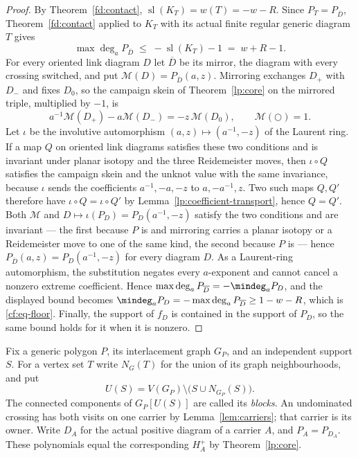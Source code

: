 \begin{proof}
By Theorem~\ref{fd:contact}, $\operatorname{sl}(K_T)=w(T)=-w-R$. Since
$P_T=P_{\overline D}$, Theorem~\ref{fd:contact} applied to $K_T$ with its
actual finite regular generic diagram $T$ gives
\[
\max\deg_a P_{\overline D}\;\leq\;-\operatorname{sl}(K_T)-1\;=\;w+R-1 .
\]
For every oriented link diagram $D$ let $\overline D$ be its mirror, the
diagram with every crossing switched, and put
$\mathcal M(D)=P_{\overline D}(a,z)$. Mirroring exchanges $D_+$ with $D_-$
and fixes $D_0$, so the campaign skein of Theorem~\ref{lp:core} on the
mirrored triple, multiplied by $-1$, is
\[
 a^{-1}\mathcal M(D_+)-a\mathcal M(D_-)=-z\,\mathcal M(D_0),
 \qquad \mathcal M(\bigcirc)=1.
\]
Let $\iota$ be the involutive automorphism $(a,z)\mapsto(a^{-1},-z)$ of
the Laurent ring. If a map $Q$ on oriented link diagrams satisfies these
two conditions and is invariant under planar isotopy and the three
Reidemeister moves, then $\iota\circ Q$ satisfies the campaign skein and
the unknot value with the same invariance, because $\iota$ sends the
coefficients $a^{-1},-a,-z$ to $a,-a^{-1},z$. Two such maps $Q,Q'$
therefore have $\iota\circ Q=\iota\circ Q'$ by
Lemma~\ref{lp:coefficient-transport}, hence $Q=Q'$. Both $\mathcal M$
and $D\mapsto\iota(P_D)=P_D(a^{-1},-z)$ satisfy the two conditions and are
invariant --- the first because $P$ is and mirroring carries a planar
isotopy or a Reidemeister move to one of the same kind, the second because
$P$ is --- hence $P_{\overline D}(a,z)=P_D(a^{-1},-z)$ for every diagram
$D$. As a Laurent-ring automorphism, the
substitution negates every $a$-exponent and cannot cancel a nonzero extreme
coefficient. Hence
$\max\deg_a P_{\overline D}=-\mindeg_a P_D$, and the displayed bound becomes
$\mindeg_a P_D=-\max\deg_a P_{\overline D}\geq1-w-R$, which is
\eqref{cf:eq-floor}. Finally, the support of $f_D$ is contained in the support of
$P_D$, so the same bound holds for it when it is nonzero.

\end{proof}

\begin{definition}\label{cb:blocks}\leanok
Fix a generic polygon $P$, its interlacement graph $G_P$, and an
independent support $S$. For a vertex set $T$ write $N_G(T)$ for the
union of its graph neighbourhoods, and put
\begin{equation}\label{cb:undominated}
 U(S)=V(G_P)\setminus\bigl(S\cup N_{G_P}(S)\bigr).
\end{equation}
The connected components of $G_P[U(S)]$ are called its \emph{blocks}.
An undominated crossing has both visits on one carrier by
Lemma~\ref{lem:carriers}; that carrier is its owner. Write $D_A$ for
the actual positive diagram of a carrier $A$, and $P_A=P_{D_A}$.
These polynomials equal the corresponding $H_A^+$ by
Theorem~\ref{lp:core}.
\end{definition}

